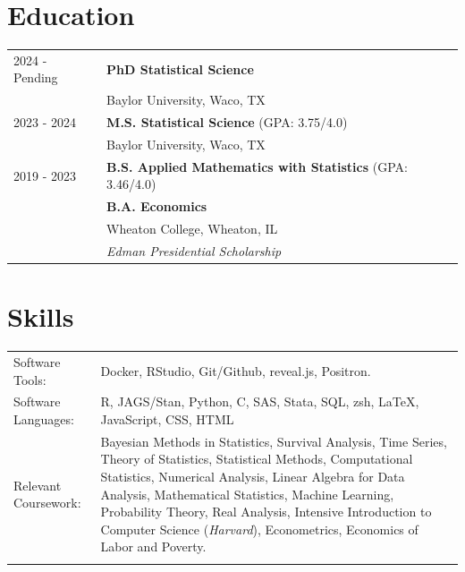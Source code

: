 \documentclass[a4paper,12pt]{article}
\begin{document}
\section{Education}
\begin{tabularx}{\linewidth}{@{}l X@{}}	
2024 - Pending & \textbf{PhD Statistical Science} \hfill   \\ 
\null & Baylor University, Waco, TX \vspace{0.3cm}\\
2023 - 2024 & \textbf{M.S. Statistical Science} \hfill (GPA: 3.75/4.0)  \\ 
\null & Baylor University, Waco, TX \vspace{0.3cm}\\
2019 - 2023 & \textbf{B.S. Applied Mathematics with Statistics} \hfill (GPA: 3.46/4.0) \\ 
\null & \textbf{B.A. Economics} \\
\null & Wheaton College, Wheaton, IL \\
\null & \textit{Edman Presidential Scholarship} \\

\end{tabularx}


\section{Skills}
\begin{tabularx}{\linewidth}{@{}l X@{}}
Software Tools:  &  \normalsize{Docker, RStudio, Git/Github, reveal.js, Positron.} \vspace{0.3cm}\\  
Software Languages: & \normalsize{R, JAGS/Stan, Python, C, SAS, Stata, SQL, zsh, \LaTeX, JavaScript, CSS, HTML}\vspace{0.25cm}\\
Relevant Coursework: &  \normalsize{Bayesian Methods in Statistics,  Survival Analysis, Time Series, Theory of Statistics, Statistical Methods, Computational Statistics, Numerical Analysis, Linear Algebra for Data Analysis, Mathematical Statistics, Machine Learning, Probability Theory, Real Analysis, Intensive Introduction to Computer Science (\textit{Harvard}), Econometrics, Economics of Labor and Poverty.}\\
\\
\end{tabularx}
\end{document}

